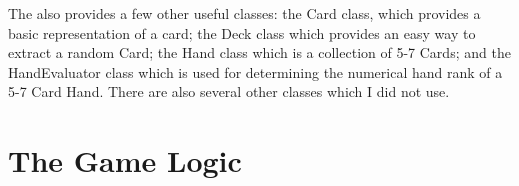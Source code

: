 
The \meer also provides a few other useful classes: the Card class, which provides a basic representation of a card; the Deck class which provides an easy way to extract a random Card; the Hand class which is a collection of 5-7 Cards; and the HandEvaluator class which is used for determining the numerical hand rank of a 5-7 Card Hand. There are also several other classes which I did not use.




\section{The Game Logic}						%


